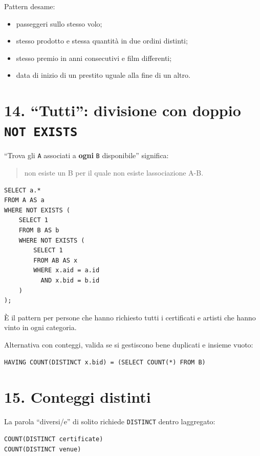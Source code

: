 \documentclass[
  10pt,
  a4paper,
]{article}
\providecommand{\tightlist}{%
  \setlength{\itemsep}{0pt}\setlength{\parskip}{0pt}}
\begin{document}
Pattern d\textquotesingle esame:

\begin{itemize}
\tightlist
\item
  passeggeri sullo stesso volo;
\item
  stesso prodotto e stessa quantità in due ordini distinti;
\item
  stesso premio in anni consecutivi e film differenti;
\item
  data di inizio di un prestito uguale alla fine di un altro.
\end{itemize}

\section{\texorpdfstring{14. ``Tutti'': divisione con doppio
\texttt{NOT\ EXISTS}}{14. ``Tutti'': divisione con doppio NOT EXISTS}}\label{14-tutti-divisione-con-doppio-not-exists}

``Trova gli \texttt{A} associati a \textbf{ogni} \texttt{B}
disponibile'' significa:

\begin{quote}
non esiste un B per il quale non esiste l\textquotesingle associazione
A-B.
\end{quote}

\begin{verbatim}
SELECT a.*
FROM A AS a
WHERE NOT EXISTS (
    SELECT 1
    FROM B AS b
    WHERE NOT EXISTS (
        SELECT 1
        FROM AB AS x
        WHERE x.aid = a.id
          AND x.bid = b.id
    )
);
\end{verbatim}

È il pattern per persone che hanno richiesto tutti i certificati e
artisti che hanno vinto in ogni categoria.

Alternativa con conteggi, valida se si gestiscono bene duplicati e
insieme vuoto:

\begin{verbatim}
HAVING COUNT(DISTINCT x.bid) = (SELECT COUNT(*) FROM B)
\end{verbatim}

\section{15. Conteggi distinti}\label{15-conteggi-distinti}

La parola ``diversi/e'' di solito richiede \texttt{DISTINCT} dentro
l\textquotesingle aggregato:

\begin{verbatim}
COUNT(DISTINCT certificate)
COUNT(DISTINCT venue)
\end{verbatim}
\end{document}
